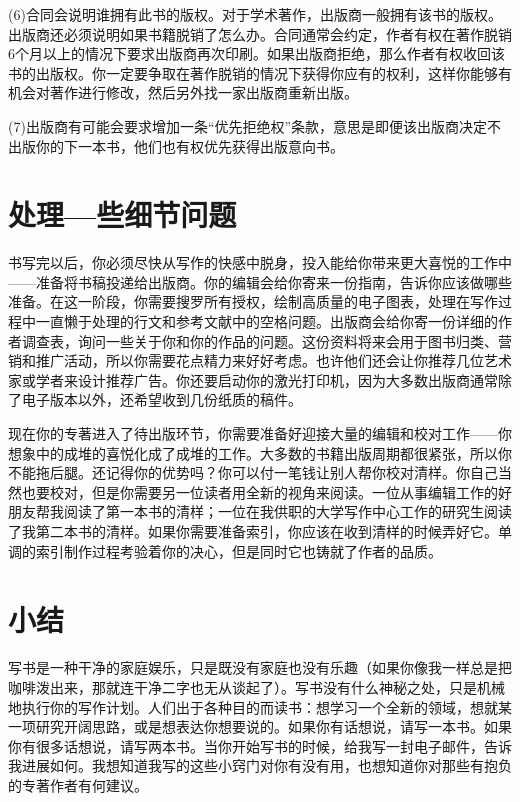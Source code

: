 (6)合同会说明谁拥有此书的版权。对于学术著作，出版商一般拥有该书的版权。出版商还必须说明如果书籍脱销了怎么办。合同通常会约定，作者有权在著作脱销6个月以上的情况下要求出版商再次印刷。如果出版商拒绝，那么作者有权收回该书的出版权。你一定要争取在著作脱销的情况下获得你应有的权利，这样你能够有机会对著作进行修改，然后另外找一家出版商重新出版。

(7)出版商有可能会要求增加一条“优先拒绝权”条款，意思是即便该出版商决定不出版你的下一本书，他们也有权优先获得出版意向书。



\section{处理—些细节问题}
书写完以后，你必须尽快从写作的快感中脱身，投入能给你带来更大喜悦的工作中——准备将书稿投递给出版商。你的编辑会给你寄来一份指南，告诉你应该做哪些准备。在这一阶段，你需要搜罗所有授权，绘制高质量的电子图表，处理在写作过程中一直懒于处理的行文和参考文献中的空格问题。出版商会给你寄一份详细的作者调查表，询问一些关于你和你的作品的问题。这份资料将来会用于图书归类、营销和推广活动，所以你需要花点精力来好好考虑。也许他们还会让你推荐几位艺术家或学者来设计推荐广告。你还要启动你的激光打印机，因为大多数出版商通常除了电子版本以外，还希望收到几份纸质的稿件。

现在你的专著进入了待出版环节，你需要准备好迎接大量的编辑和校对工作——你想象中的成堆的喜悦化成了成堆的工作。大多数的书籍出版周期都很紧张，所以你不能拖后腿。还记得你的优势吗？你可以付一笔钱让别人帮你校对清样。你自己当然也要校对，但是你需要另一位读者用全新的视角来阅读。一位从事编辑工作的好朋友帮我阅读了第一本书的清样；一位在我供职的大学写作中心工作的研究生阅读了我第二本书的清样。如果你需要准备索引，你应该在收到清样的时候弄好它。单调的索引制作过程考验着你的决心，但是同时它也铸就了作者的品质。



\section{小结}
写书是一种干净的家庭娱乐，只是既没有家庭也没有乐趣（如果你像我一样总是把咖啡泼出来，那就连干净二字也无从谈起了）。写书没有什么神秘之处，只是机械地执行你的写作计划。人们出于各种目的而读书：想学习一个全新的领域，想就某一项研究开阔思路，或是想表达你想要说的。如果你有话想说，请写一本书。如果你有很多话想说，请写两本书。当你开始写书的时候，给我写一封电子邮件，告诉我进展如何。我想知道我写的这些小窍门对你有没有用，也想知道你对那些有抱负的专著作者有何建议。